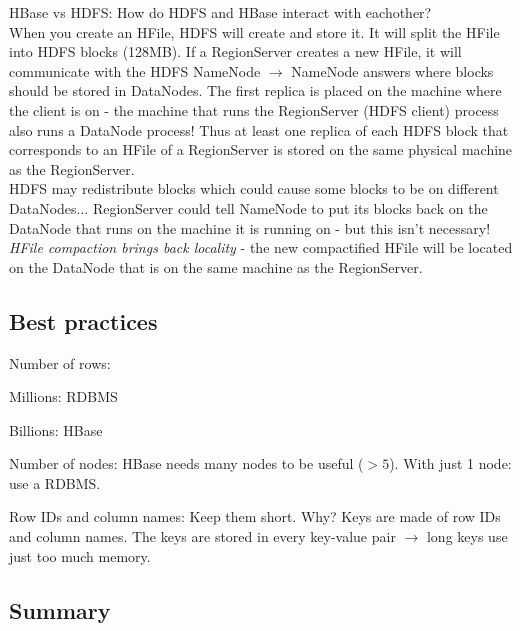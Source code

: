 \documentclass[11pt,oneside,a4paper]{article}
\begin{document}
HBase vs HDFS: How do HDFS and HBase interact with eachother?\\
When you create an HFile, HDFS will create and store it. It will split the HFile into HDFS blocks (128MB). If a RegionServer creates a new HFile, it will communicate with the HDFS NameNode $\rightarrow$ NameNode answers where blocks should be stored in DataNodes. The first replica is placed on the machine where the client is on - the machine that runs the RegionServer (HDFS client) process also runs a DataNode process! Thus at least one replica of each HDFS block that corresponds to an HFile of a RegionServer is stored on the same physical machine as the RegionServer.\\

HDFS may redistribute blocks which could cause some blocks to be on different DataNodes... RegionServer could tell NameNode to put its blocks back on the DataNode that runs on the machine it is running on - but this isn't necessary! \textit{HFile compaction brings back locality} - the new compactified HFile will be located on the DataNode that is on the same machine as the RegionServer.

\subsection{Best practices}

\begin{compactitem}
	\item Number of rows:
	\begin{compactitem}
		\item Millions: RDBMS
		\item Billions: HBase
	\end{compactitem}
	\item Number of nodes: HBase needs many nodes to be useful (\textbf{$> 5$}). With just 1 node: use a RDBMS.
	\item Row IDs and column names: Keep them short. Why? Keys are made of row IDs and column names. The keys are stored in every key-value pair $\rightarrow$ long keys use just too much memory.
\end{compactitem}

\subsection{Summary}
\end{document}
